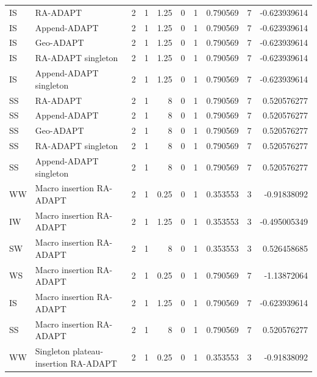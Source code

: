 \documentclass[10pt,letterpaper]{article}
\begin{document}
\begin{longtable}{@{}llrrrrrrrr@{}}
IS & RA-ADAPT & 2 & 1 & 1.25 & 0 & 1 & 0.790569 & 7 & -0.623939614 \\
IS & Append-ADAPT & 2 & 1 & 1.25 & 0 & 1 & 0.790569 & 7 & -0.623939614 \\
IS & Geo-ADAPT & 2 & 1 & 1.25 & 0 & 1 & 0.790569 & 7 & -0.623939614 \\
IS & RA-ADAPT singleton & 2 & 1 & 1.25 & 0 & 1 & 0.790569 & 7 & -0.623939614 \\
IS & Append-ADAPT singleton & 2 & 1 & 1.25 & 0 & 1 & 0.790569 & 7 & -0.623939614 \\
SS & RA-ADAPT & 2 & 1 & 8 & 0 & 1 & 0.790569 & 7 & 0.520576277 \\
SS & Append-ADAPT & 2 & 1 & 8 & 0 & 1 & 0.790569 & 7 & 0.520576277 \\
SS & Geo-ADAPT & 2 & 1 & 8 & 0 & 1 & 0.790569 & 7 & 0.520576277 \\
SS & RA-ADAPT singleton & 2 & 1 & 8 & 0 & 1 & 0.790569 & 7 & 0.520576277 \\
SS & Append-ADAPT singleton & 2 & 1 & 8 & 0 & 1 & 0.790569 & 7 & 0.520576277 \\
WW & Macro insertion RA-ADAPT & 2 & 1 & 0.25 & 0 & 1 & 0.353553 & 3 & -0.91838092 \\
IW & Macro insertion RA-ADAPT & 2 & 1 & 1.25 & 0 & 1 & 0.353553 & 3 & -0.495005349 \\
SW & Macro insertion RA-ADAPT & 2 & 1 & 8 & 0 & 1 & 0.353553 & 3 & 0.526458685 \\
WS & Macro insertion RA-ADAPT & 2 & 1 & 0.25 & 0 & 1 & 0.790569 & 7 & -1.13872064 \\
IS & Macro insertion RA-ADAPT & 2 & 1 & 1.25 & 0 & 1 & 0.790569 & 7 & -0.623939614 \\
SS & Macro insertion RA-ADAPT & 2 & 1 & 8 & 0 & 1 & 0.790569 & 7 & 0.520576277 \\
WW & Singleton plateau-insertion RA-ADAPT & 2 & 1 & 0.25 & 0 & 1 & 0.353553 & 3 & -0.91838092 \\
\bottomrule
\end{longtable}
\end{document}

